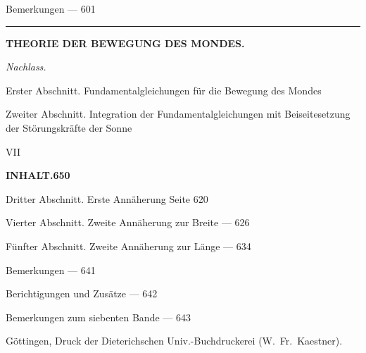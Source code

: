 \documentclass[10pt,a4paper]{article}
\newenvironment{hangparas}[2]{\setlength{\hangindent}{#1}\setlength{\hangafter}{#2}}{}
\begin{document}
\vspace{0.5em}

\noindent Bemerkungen \hfill --- 601

\vspace{1.5em}

\begin{center}
\rule{0.5\textwidth}{0.4pt}
\end{center}

\vspace{1em}

\begin{center}
\textbf{THEORIE DER BEWEGUNG DES MONDES.}
\end{center}

\vspace{0.3em}

\noindent\textit{Nachlass.}

\vspace{0.2em}

\begin{hangparas}{1em}{1}
\noindent Erster Abschnitt. Fundamentalgleichungen für die Bewegung des Mondes

\noindent Zweiter Abschnitt. Integration der Fundamentalgleichungen mit Beiseitesetzung der Störungskräfte der Sonne
\end{hangparas}

\vspace{2em}

\begin{flushright}
VII
\end{flushright}

\newpage

\begin{center}
\Large\textbf{INHALT.}\hfill\textbf{650}
\end{center}

\vspace{0.5em}

\begin{hangparas}{1em}{1}
\noindent Dritter Abschnitt. Erste Annäherung \hfill Seite 620

\noindent Vierter Abschnitt. Zweite Annäherung zur Breite \hfill --- 626

\noindent Fünfter Abschnitt. Zweite Annäherung zur Länge \hfill --- 634
\end{hangparas}

\vspace{0.5em}

\noindent Bemerkungen \hfill --- 641

\vspace{1.5em}

\begin{hangparas}{1em}{1}
\noindent Berichtigungen und Zusätze \hfill --- 642

\noindent Bemerkungen zum siebenten Bande \hfill --- 643
\end{hangparas}

\vspace{3em}

\begin{center}
Göttingen, Druck der Dieterichschen Univ.-Buchdruckerei (W.~Fr.~Kaestner).
\end{center}
\end{document}

